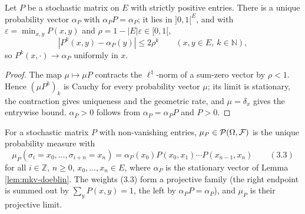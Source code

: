\begin{lemma}
    \label{lem:mkv-doeblin}
    \leanok

    Let $P$ be a stochastic matrix on $E$ with strictly positive entries. There is a unique
    probability vector $\alpha_P$ with $\alpha_P P = \alpha_P$; it lies in $]0,1[^E$, and with
    $\varepsilon = \min_{x,y} P(x,y)$ and $\rho = 1 - |E|\varepsilon \in [0,1[$,
    \[
        |P^k(x,y) - \alpha_P(y)| \le 2\rho^k \qquad (x, y \in E,\ k \in \mathbb{N}),
    \]
    so $P^k(x, \cdot) \to \alpha_P$ uniformly in $x$.
\end{lemma}
\begin{proof}
    \leanok

    The map $\mu \mapsto \mu P$ contracts the $\ell^1$-norm of a sum-zero vector by
    $\rho < 1$. Hence $(\mu P^k)_k$ is Cauchy for every probability vector $\mu$; its limit is
    stationary, the contraction gives uniqueness and the geometric rate, and $\mu = \delta_x$
    gives the entrywise bound. $\alpha_P > 0$ follows from $\alpha_P = \alpha_P P$ and $P > 0$.
\end{proof}

\begin{definition}
    \label{def:mkv-chain}
    \leanok

    For a stochastic matrix $P$ with non-vanishing entries, $\mu_P \in \mathcal{P}(\Omega, \mathcal{F})$
    is the unique probability measure with
    \[
        \mu_P(\sigma_i = x_0, \dots, \sigma_{i+n} = x_n)
          = \alpha_P(x_0) P(x_0,x_1)\cdots P(x_{n-1},x_n) \qquad (3.3)
    \]
    for all $i \in \mathbb{Z}$, $n \ge 0$, $x_0, \dots, x_n \in E$, where $\alpha_P$ is the
    stationary vector of Lemma \ref{lem:mkv-doeblin}. The weights (3.3) form a projective family
    (the right endpoint is summed out by $\sum_y P(x,y) = 1$, the left by
    $\alpha_P P = \alpha_P$), and $\mu_P$ is their projective limit.
\end{definition}

